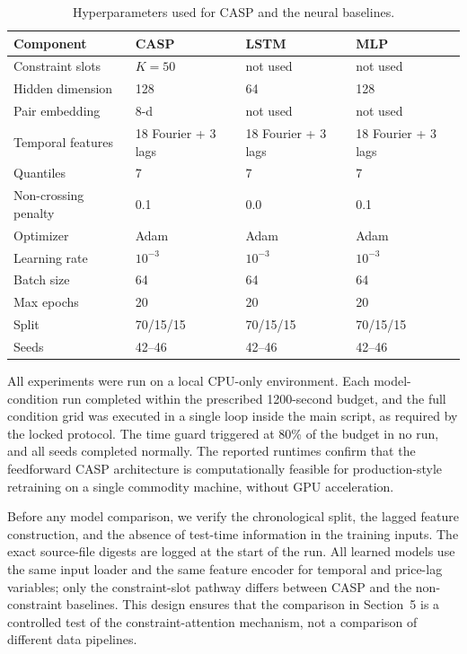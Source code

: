 \documentclass{article}
\begin{document}
\begin{table}[ht]
\centering
\caption{Hyperparameters used for CASP and the neural baselines.}
\label{tab:hyperparams}
\begin{tabular}{llll}
\toprule
\textbf{Component} & \textbf{CASP} & \textbf{LSTM} & \textbf{MLP} \\
\midrule
Constraint slots & $K = 50$ & not used & not used \\
Hidden dimension & 128 & 64 & 128 \\
Pair embedding & 8-d & not used & not used \\
Temporal features & 18 Fourier + 3 lags & 18 Fourier + 3 lags & 18 Fourier + 3 lags \\
Quantiles & 7 & 7 & 7 \\
Non-crossing penalty & 0.1 & 0.0 & 0.1 \\
Optimizer & Adam & Adam & Adam \\
Learning rate & $10^{-3}$ & $10^{-3}$ & $10^{-3}$ \\
Batch size & 64 & 64 & 64 \\
Max epochs & 20 & 20 & 20 \\
Split & 70/15/15 & 70/15/15 & 70/15/15 \\
Seeds & 42--46 & 42--46 & 42--46 \\
\bottomrule
\end{tabular}
\end{table}

All experiments were run on a local CPU-only environment. Each model-condition run completed within the prescribed 1200-second budget, and the full condition grid was executed in a single loop inside the main script, as required by the locked protocol. The time guard triggered at 80\% of the budget in no run, and all seeds completed normally. The reported runtimes confirm that the feedforward CASP architecture is computationally feasible for production-style retraining on a single commodity machine, without GPU acceleration.

Before any model comparison, we verify the chronological split, the lagged feature construction, and the absence of test-time information in the training inputs. The exact source-file digests are logged at the start of the run. All learned models use the same input loader and the same feature encoder for temporal and price-lag variables; only the constraint-slot pathway differs between CASP and the non-constraint baselines. This design ensures that the comparison in Section~5 is a controlled test of the constraint-attention mechanism, not a comparison of different data pipelines.
\end{document}
